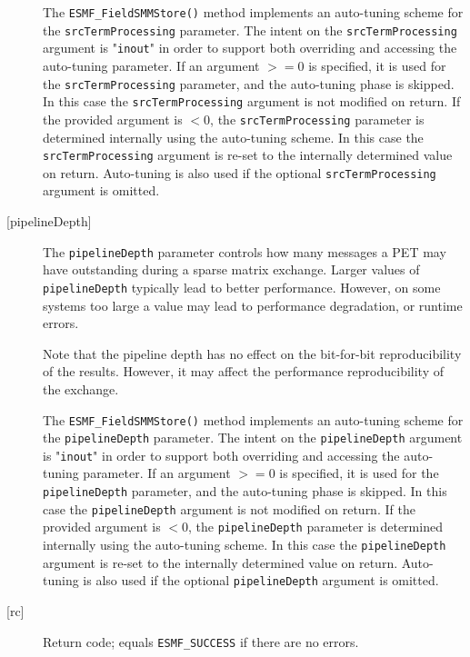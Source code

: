 \begin{description}
       \begin{sloppypar}
       The {\tt ESMF\_FieldSMMStore()} method implements an auto-tuning scheme
       for the {\tt srcTermProcessing} parameter. The intent on the
       {\tt srcTermProcessing} argument is "{\tt inout}" in order to
       support both overriding and accessing the auto-tuning parameter.
       If an argument $>= 0$ is specified, it is used for the
       {\tt srcTermProcessing} parameter, and the auto-tuning phase is skipped.
       In this case the {\tt srcTermProcessing} argument is not modified on
       return. If the provided argument is $< 0$, the {\tt srcTermProcessing}
       parameter is determined internally using the auto-tuning scheme. In this
       case the {\tt srcTermProcessing} argument is re-set to the internally
       determined value on return. Auto-tuning is also used if the optional
       {\tt srcTermProcessing} argument is omitted.
       \end{sloppypar}
  
     \item [{[pipelineDepth]}]
       The {\tt pipelineDepth} parameter controls how many messages a PET
       may have outstanding during a sparse matrix exchange. Larger values
       of {\tt pipelineDepth} typically lead to better performance. However,
       on some systems too large a value may lead to performance degradation,
       or runtime errors.
  
       Note that the pipeline depth has no effect on the bit-for-bit
       reproducibility of the results. However, it may affect the performance
       reproducibility of the exchange.
  
       The {\tt ESMF\_FieldSMMStore()} method implements an auto-tuning scheme
       for the {\tt pipelineDepth} parameter. The intent on the
       {\tt pipelineDepth} argument is "{\tt inout}" in order to
       support both overriding and accessing the auto-tuning parameter.
       If an argument $>= 0$ is specified, it is used for the
       {\tt pipelineDepth} parameter, and the auto-tuning phase is skipped.
       In this case the {\tt pipelineDepth} argument is not modified on
       return. If the provided argument is $< 0$, the {\tt pipelineDepth}
       parameter is determined internally using the auto-tuning scheme. In this
       case the {\tt pipelineDepth} argument is re-set to the internally
       determined value on return. Auto-tuning is also used if the optional
       {\tt pipelineDepth} argument is omitted.
  
     \item [{[rc]}]
       Return code; equals {\tt ESMF\_SUCCESS} if there are no errors.
  
   \end{description} 
    
